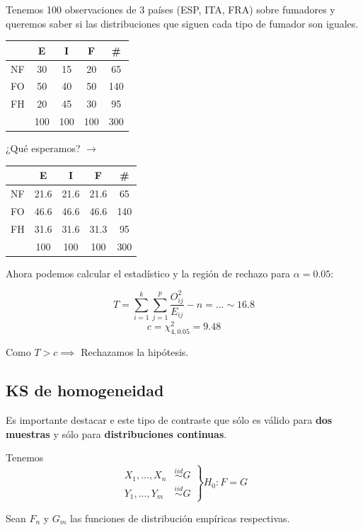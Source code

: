 \begin{example}

Tenemos 100 observaciones de 3 países (ESP, ITA, FRA) sobre fumadores y queremos saber si las distribuciones que siguen cada tipo de fumador son iguales.

\begin{center}


\begin{tabular}{c|ccc|c}
 & E & I & F & \#\\\hline
NF&30&15&20&65\\
FO&50&40&50&140\\
FH&20&45&30&95\\\hline
&100 & 100 & 100 & 300
\end{tabular}
¿Qué esperamos? $\to$
\begin{tabular}{c|ccc|c}
 & E & I & F & \#\\\hline
NF & 21.6 & 21.6 & 21.6 & 65 \\
FO & 46.6 & 46.6 & 46.6 & 140 \\
FH & 31.6 & 31.6 & 31.3 & 95 \\
\hline
&100 & 100 & 100 & 300
\end{tabular}
\end{center}

Ahora podemos calcular el estadístico y la región de rechazo para $α=0.05$:

\[ T = \sum_{i=1}^k \sum_{j=1}^p \frac{O_{ij}^2}{E_{ij}} -n = ... \sim 16.8\]
\[ c = \chi^2_{4,0.05} = 9.48\]

Como $T > c \implies $ Rechazamos la hipótesis.

\end{example}

\subsection{KS de homogeneidad}

Es importante destacar e este tipo de contraste que sólo es válido para \textbf{dos muestras} y sólo para \textbf{distribuciones continuas}.

Tenemos \[
\left.
\begin{array}{cc}
X_{1} ,...,X_{n} &\overset{iid}{\sim} G\\ 
Y_{1} ,...,Y_m &\overset{iid}{\sim}G
\end{array} \right\} H_0 : F = G
\]

Sean $F_n$ y $G_m$ las funciones de distribución empíricas respectivas.

